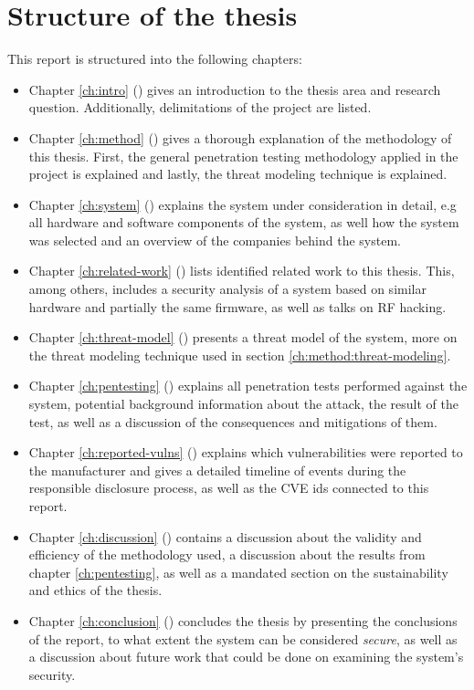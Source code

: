 \section{Structure of the thesis} \label{ch:intro:structure}
This report is structured into the following chapters:
\begin{itemize}
    \item Chapter \ref{ch:intro} () gives an introduction to the thesis area and research question. Additionally, delimitations of the project are listed.
    \item Chapter \ref{ch:method} () gives a thorough explanation of the methodology of this thesis. First, the general penetration testing methodology applied in the project is explained and lastly, the threat modeling technique is explained.
    \item Chapter \ref{ch:system} () explains the system under consideration in detail, e.g all hardware and software components of the system, as well how the system was selected and an overview of the companies behind the system.
    \item Chapter \ref{ch:related-work} () lists identified related work to this thesis. This, among others, includes a security analysis of a system based on similar hardware and partially the same firmware, as well as talks on \gls{RF} hacking.
    \item Chapter \ref{ch:threat-model} () presents a threat model of the system, more on the threat modeling technique used in section \ref{ch:method:threat-modeling}.
    \item Chapter \ref{ch:pentesting} () explains all penetration tests performed against the system, potential background information about the attack, the result of the test, as well as a discussion of the consequences and mitigations of them.
    \item Chapter \ref{ch:reported-vulns} () explains which vulnerabilities were reported to the manufacturer and gives a detailed timeline of events during the responsible disclosure process, as well as the CVE ids connected to this report.
    \item Chapter \ref{ch:discussion} () contains a discussion about the validity and efficiency of the methodology used, a discussion about the results from chapter \ref{ch:pentesting}, as well as a mandated section on the sustainability and ethics of the thesis.
    \item Chapter \ref{ch:conclusion} () concludes the thesis by presenting the conclusions of the report, to what extent the system can be considered \textit{secure}, as well as a discussion about future work that could be done on examining the system's security.
\end{itemize}
